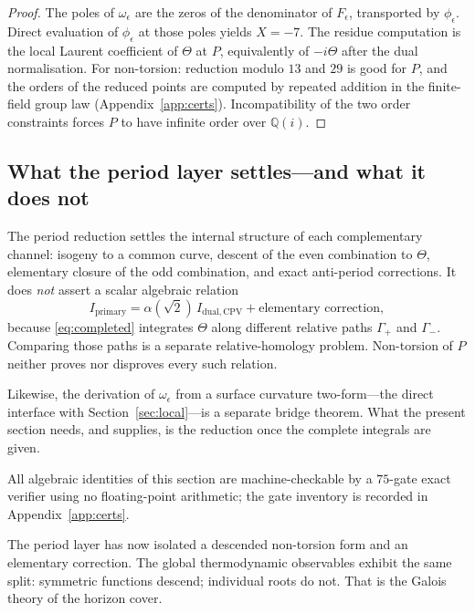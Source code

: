 \documentclass[11pt,a4paper]{article}
\theoremstyle{definition}
\theoremstyle{remark}
\newcommand{\Q}{\mathbb{Q}}
\begin{document}
\begin{proof}
The poles of \(\omega_\epsilon\) are the zeros of the denominator of
\(F_\epsilon\), transported by \(\phi_\epsilon\). Direct evaluation of
\(\phi_\epsilon\) at those poles yields \(X=-7\). The residue computation is the
local Laurent coefficient of \(\Theta\) at \(P\), equivalently of
\(-i\Theta\) after the dual normalisation. For non-torsion: reduction modulo
\(13\) and \(29\) is good for \(P\), and the orders of the reduced points are
computed by repeated addition in the finite-field group law
(Appendix~\ref{app:certs}). Incompatibility of the two order constraints
forces \(P\) to have infinite order over \(\Q(i)\).
\end{proof}

\subsection{What the period layer settles---and what it does not}

The period reduction settles the internal structure of each complementary
channel: isogeny to a common curve, descent of the even combination to
\(\Theta\), elementary closure of the odd combination, and exact anti-period
corrections. It does \emph{not} assert a scalar algebraic relation
\[
I_{\mathrm{primary}}
=
\alpha(\sqrt2)\,I_{\mathrm{dual,CPV}}
+\text{elementary correction},
\]
because \eqref{eq:completed} integrates \(\Theta\) along different relative
paths \(\Gamma_+\) and \(\Gamma_-\). Comparing those paths is a separate
relative-homology problem. Non-torsion of \(P\) neither proves nor disproves
every such relation.

Likewise, the derivation of \(\omega_\epsilon\) from a surface curvature
two-form---the direct interface with Section~\ref{sec:local}---is a separate
bridge theorem. What the present section needs, and supplies, is the reduction
once the complete integrals are given.

All algebraic identities of this section are machine-checkable by a \(75\)-gate
exact verifier using no floating-point arithmetic; the gate inventory is
recorded in Appendix~\ref{app:certs}.

The period layer has now isolated a descended non-torsion form and an
elementary correction. The global thermodynamic observables exhibit the same
split: symmetric functions descend; individual roots do not. That is the Galois
theory of the horizon cover.

\end{document}
